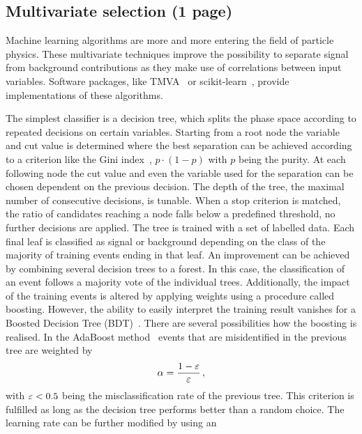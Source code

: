 
\subsection{Multivariate selection (1 page)}
\label{sec:dataanalysis:selection:bdt}

Machine learning algorithms are more and more entering the field of particle
physics. These multivariate techniques improve the possibility to separate
signal from background contributions as they make use of correlations between
input variables. Software packages, like TMVA~\cite{Hocker:2007ht} or
scikit-learn~\cite{scikit-learn}, provide implementations of these algorithms.

The simplest classifier is a decision tree, which splits the phase space
according to repeated decisions on certain variables. Starting from a root
node the variable and cut value is determined where the best separation can be
achieved according to a criterion like the Gini index~\cite{giniindex}, $p
\cdot (1-p)$ with $p$ being the purity. At each following node the cut value
and even the variable used for the separation can be chosen dependent on the
previous decision. The depth of the tree, \ie the maximal number of
consecutive decisions, is tunable. When a stop criterion is matched, \eg the
ratio of candidates reaching a node falls below a predefined threshold, no
further decisions are applied. The tree is trained with a set of labelled
data. Each final leaf is classified as signal or background depending on the
class of the majority of training events ending in that leaf. An improvement
can be achieved by combining several decision trees to a forest. In this case,
the classification of an event follows a majority vote of the individual
trees. Additionally, the impact of the training events is altered by applying
weights using a procedure called boosting. However, the ability to easily
interpret the training result vanishes for a Boosted Decision Tree
(BDT)~\cite{Breiman,Roe}. There are several possibilities how the boosting is
realised. In the AdaBoost method~\cite{AdaBoost} events that are misidentified
in the previous tree are weighted by
\begin{align}
	\alpha = \frac{1 - {\varepsilon}}{{\varepsilon}}\,,
\end{align}
with ${\varepsilon} < \num{0.5}$ being the misclassification rate of the previous tree.
This criterion is fulfilled as long as the decision tree performs better than
a random choice. The learning rate can be further modified by using an

